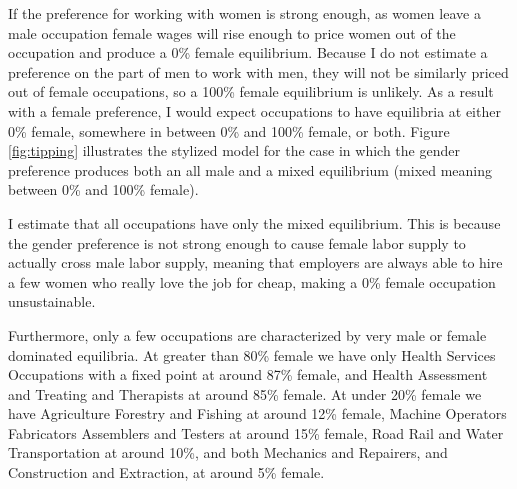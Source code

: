 \documentclass[11pt]{article}
\begin{document}
If the preference for working with women is strong enough, as women leave a male occupation female wages will rise enough to price women out of the occupation and produce a 0\% female equilibrium. Because I do not estimate a preference on the part of men to work with men, they will not be similarly priced out of female occupations, so a 100\% female equilibrium is unlikely. As a result with a female preference, I would expect occupations to have equilibria at either 0\% female, somewhere in between 0\% and 100\% female, or both. Figure \ref{fig:tipping} illustrates the stylized model for the case in which the gender preference produces both an all male and a mixed equilibrium (mixed meaning between 0\% and 100\% female). 



I estimate that all occupations have only the mixed equilibrium. This is because the gender preference is not strong enough to cause female labor supply to actually cross male labor supply, meaning that employers are always able to hire a few women who really love the job for cheap, making a 0\% female occupation unsustainable.


Furthermore, only a few occupations are characterized by very male or female dominated equilibria. At greater than 80\% female we have only Health Services Occupations with a fixed point at around 87\% female, and Health Assessment and Treating and Therapists at around 85\% female. At under 20\% female we have Agriculture Forestry and Fishing at around 12\% female, Machine Operators Fabricators Assemblers and Testers at around 15\% female, Road Rail and Water Transportation at around 10\%, and both Mechanics and Repairers, and Construction and Extraction, at around 5\% female.
\end{document}
